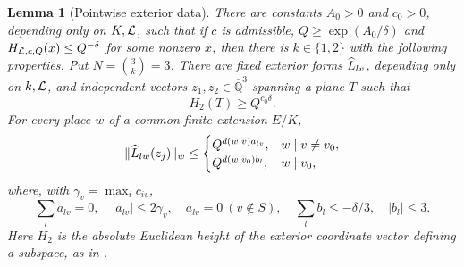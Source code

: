 \documentclass[11pt]{article}
\numberwithin{equation}{section}
\newtheorem{lemma}[theorem]{Lemma}
\theoremstyle{remark}\newtheorem{remark}[theorem]{Remark}
\newcommand{\Qbar}{\overline{\mathbb Q}}
\begin{document}
\begin{lemma}[Pointwise exterior data]\label{lem:packet}
There are constants $A_0>0$ and $c_0>0$, depending only on $K,\mathcal L$, such
that if $c$ is admissible, $Q\ge\exp(A_0/\delta)$ and
$H_{\mathcal L,c,Q}(x)\le Q^{-\delta}$ for some nonzero $x$, then there is
$k\in\{1,2\}$ with the following properties. Put $N=\binom3k=3$.
There are fixed exterior forms $\widehat L_{lv}$, depending only on $k,\mathcal L$,
and independent vectors $z_1,z_2\in\Qbar^3$ spanning a plane $T$ such that
\begin{equation}\label{eq:packetheight}
 H_2(T)\ge Q^{c_0\delta}.
\end{equation}
For every place $w$ of a common finite extension $E/K$,
\begin{equation}\label{eq:packetlocal}
 \|\widehat L_{lw}(z_j)\|_w\le
 \begin{cases}Q^{d(w\mid v)a_{lv}},&w\mid v\ne v_0,\\
 Q^{d(w\mid v_0)b_l},&w\mid v_0,
 \end{cases}
\end{equation}
where, with $\gamma_v=\max_i c_{iv}$,
\begin{equation}\label{eq:packetweights}
 \sum_l a_{lv}=0,\quad |a_{lv}|\le2\gamma_v,\quad
 a_{lv}=0\ (v\notin S),\quad
 \sum_l b_l\le-\delta/3,\quad |b_l|\le3.
\end{equation}
Here $H_2$ is the absolute Euclidean height of the exterior coordinate
vector defining a subspace, as in \cite[Section~6]{EF13}.
\end{lemma}
\end{document}
